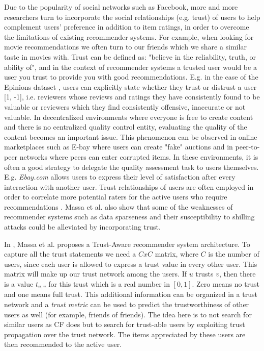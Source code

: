 Due to the popularity of social networks such as Facebook, more and more
researchers turn to incorporate the social relationships (e.g. trust) of users
to help complement users’ preference in addition to item ratings, in order to
overcome the limitations of existing recommender systems. For example, when
looking for movie recommendations we often turn to our friends which we share a
similar taste in movies with. Trust can be defined as: "believe in the
reliability, truth, or ability of", and in the context of recommender systems a
trusted user would be a user you trust to provide you with good
recommendations. E.g. in the case of the Epinions dataset \cite{Epinions},
users can explicitly state whether they trust or distrust a user [1, -1], i.e.
reviewers whose reviews and ratings they have consistently found to be valuable
or reviewers which they find consistently offensive, inaccurate or not
valuable. In decentralized environments where everyone is free to create
content and there is no centralized quality control entity, evaluating the
quality of the content becomes an important issue. This phenomenon can be
observed in online marketplaces such as E-bay where users can create "fake"
auctions and in peer-to-peer networks where peers can enter corrupted items. In
these environments, it is often a good strategy to delegate the quality
assessment task to users themselves. E.g. \emph{Ebay.com} allows users to
express their level of satisfaction after every interaction with another user.
Trust relationships of users are often employed in order to correlate more
potential raters for the active users who require recommendations
\cite{Massa2004, Massa2007}. Massa et al. \cite{Massa2004} also show that some
of the weaknesses of recommender systems such as data sparseness and their
susceptibility to shilling attacks could be alleviated by incorporating trust.

In \cite{Massa2004}, Massa et al. proposes a Trust-Aware recommender system
architecture.  To capture all the trust statements we need a $CxC$ matrix,
where $C$ is the number of users, since each user is allowed to express a trust
value in every other user. This matrix will make up our trust network among the
users. If $u$ trusts $v$, then there is a value $t_{u,v}$ for this trust which
is a real number in $[0,1]$. Zero means no trust and one means full trust. This
additional information can be organized in a trust network and a \emph{trust
metric} can be used to predict the trustworthiness of other users as well (for
example, friends of friends). The idea here is to not search for similar users
as CF does but to search for trust-able users by exploiting trust propagation
over the trust network. The items appreciated by these users are then
recommended to the active user.

